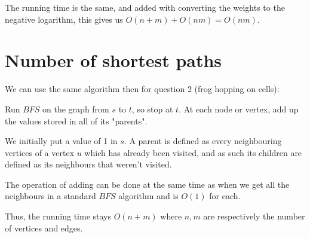 \documentclass[11pt,letterpaper]{article}
\begin{document}
		The running time is the same, and added with converting the weights to the negative logarithm, this gives us $O(n+m) + O(nm) = O(nm)$.
	
	\section{Number of shortest paths}
		We can use the same algorithm then for question 2 (frog hopping on cells):
		
		Run $BFS$ on the graph from $s$ to $t$, so stop at $t$.
		At each node or vertex, add up the values stored in all of its "parents".
		
		We initially put a value of 1 in $s$.
		A parent is defined as every neighbouring vertices of a vertex $u$ which has already been visited, and as such its children are defined as its neighbours that weren't visited.
		
		The operation of adding can be done at the same time as when we get all the neighbours in a standard $BFS$ algorithm and is $O(1)$ for each.
		
		Thus, the running time stays $O(n + m)$ where $n, m$ are respectively the number of vertices and edges.
	
\end{document}
